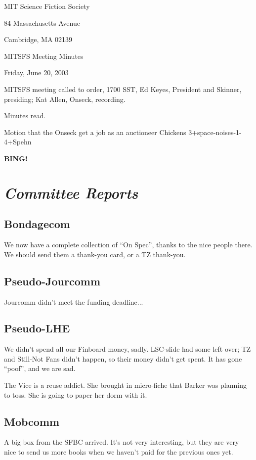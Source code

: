 \documentclass[12pt]{article}
\newcommand{\bing}{{\bf BING!} }
\newcommand{\goto}[1]{\bing \vskip 12pt \section*{{\em{#1}}}}
\begin{document}
\begin{center}

MIT Science Fiction Society 

84 Massachusetts Avenue

Cambridge, MA 02139

\vspace{12pt}

MITSFS Meeting Minutes 

Friday, June 20, 2003

\end{center}
 
\vspace{18pt}

\setlength{\parskip}{6pt}

\noindent
MITSFS meeting called to order, 1700 SST, Ed Keyes, President and
Skinner, presiding; Kat Allen,  Onseck, recording.

Minutes read.

Motion that the Onseck get a job as an auctioneer
Chickens 3+space-noises-1-4+Spehn

\goto{Committee Reports}
\subsection*{Bondagecom}
We now have a complete collection of ``On Spec'', thanks to the nice
people there. We should send them a thank-you card, or a TZ thank-you.

\subsection*{Pseudo-Jourcomm}
Jourcomm didn't meet the funding deadline...

\subsection*{Pseudo-LHE}
We didn't spend all our Finboard money, sadly.  LSC-slide had some
left over; TZ and Still-Not Fans didn't happen, so their money didn't
get spent. It has gone ``poof'', and we are sad.

The Vice is a reuse addict. She brought in micro-fiche that Barker was planning
to toss. She is going to paper her dorm with it.

\subsection*{Mobcomm}
A big box from the SFBC arrived. It's not very interesting, but they
are very nice to send us more books when we haven't paid for the
previous ones yet.
\end{document}
